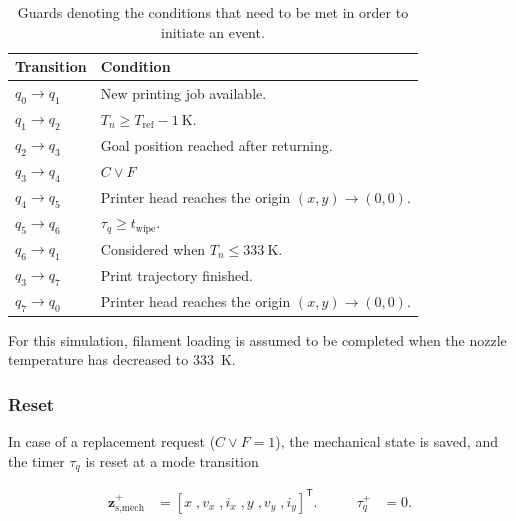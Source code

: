 \documentclass[a4paper,11pt]{article}
\begin{document}
\begin{table}[H]
    \centering
    \caption{Guards denoting the conditions that need to be met in order to initiate an event.}
    \label{tab:guards}
    \small
    \begin{tabularx}{0.8\linewidth}{
        @{}
        l
        >{\raggedright\arraybackslash}X
        @{}
    }
        \toprule
        \textbf{Transition} & \textbf{Condition} \\
        \midrule
        $q_0 \rightarrow q_1$   & New printing job available.\\
        $q_1 \rightarrow q_2$   & $T_n \geq T_{\text{ref}}-\SI{1}{\kelvin}$.\\
        $q_2 \rightarrow q_3$   & Goal position reached after returning.\\
        $q_3 \rightarrow q_4$   & $C \lor F$\\
        $q_4 \rightarrow q_5$   & Printer head reaches the origin $(x,y) \rightarrow (0,0)$.\\
        $q_5 \rightarrow q_6$   & $\tau_q \geq t_{\text{wipe}}$.\\
        $q_6 \rightarrow q_1$   & Considered when $T_n \leq \SI{333}{\kelvin}$.\\
        $q_3 \rightarrow q_7$   & Print trajectory finished.\\
        $q_7 \rightarrow q_0$   & Printer head reaches the origin $(x,y) \rightarrow (0,0)$.\\
        \bottomrule
    \end{tabularx}
\end{table}

For this simulation, filament loading is assumed to be completed when the nozzle temperature has decreased to \SI{333}{\kelvin}.

\subsubsection{Reset}
In case of a replacement request ($C \lor F=1$), the mechanical state is saved, and the timer $\tau_q$ is reset at a mode transition

\begin{equation}
\begin{aligned}
    \mathbf{z}_{\text{s,mech}}^+ &= \left[x \;, v_x \;, i_x \;, y \;, v_y \;, i_y\right]^{\mathsf{T}}.
    &\qquad
    \tau_q^+  &= 0.
\end{aligned}
\end{equation}
\end{document}
